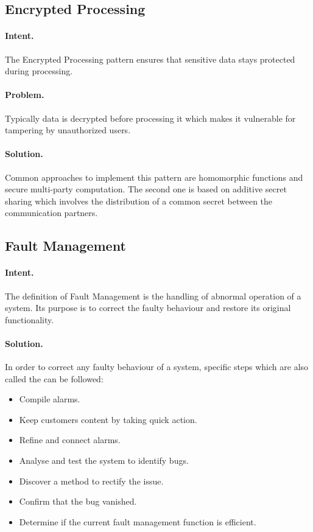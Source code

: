 \subsection{Encrypted Processing~\cite{Papoutsakis2021}} 
\label{p:ep}

\paragraph{\textbf{Intent.}} The Encrypted Processing pattern ensures that sensitive data stays protected during processing.

\paragraph{\textbf{Problem.}} Typically data is decrypted before processing it which makes it vulnerable for tampering by unauthorized users.

\paragraph{\textbf{Solution.}} Common approaches to implement this pattern are homomorphic functions and secure multi-party computation. The second one is based on additive secret sharing which involves the distribution of a common secret between the communication partners. 


\subsection{Fault Management~\cite{Papoutsakis2021}} 
\label{p:fault}

\paragraph{\textbf{Intent.}} The definition of Fault Management is the handling of abnormal operation of a system. Its purpose is to correct the faulty behaviour and restore its original functionality.

\paragraph{\textbf{Solution.}} In order to correct any faulty behaviour of a system, specific steps which are also called the  can be followed:
\begin{itemize}
	\item Compile alarms.
	\item Keep customers content by taking quick action.
	\item Refine and connect alarms.
	\item Analyse and test the system to identify bugs.
	\item Discover a method to rectify the issue.
	\item Confirm that the bug vanished.
	\item Determine if the current fault management function is efficient.
\end{itemize}


